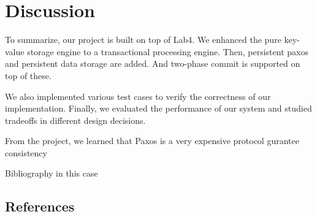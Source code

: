 \documentclass{vldb}
\begin{document}
\section{Discussion}

To summarize, our project is built on top of Lab4. We enhanced the 
pure key-value storage engine to a transactional processing engine.
Then, persistent paxos and persistent data storage are added. And 
two-phase commit is supported on top of these. 

We also implemented various test cases to verify the correctness of 
our implementation. Finally, we evaluated the performance of our 
system and studied tradeoffs in different design decisions.

From the project, we learned that Paxos is a very expensive protocol gurantee
consistency



Bibliography in this case

\subsection{References}
\end{document}
